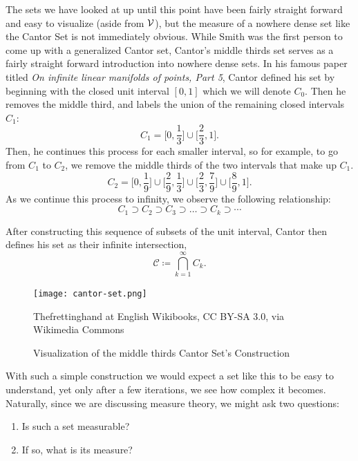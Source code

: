 \documentclass{article}
\theoremstyle{axiom} \newtheorem{axiom}{Axiom}
\theoremstyle{definition} \newtheorem{definition}{Definition}
\theoremstyle{example} \newtheorem{example}{Example}
\theoremstyle{proposition} \newtheorem{prop}{Proposition}
\theoremstyle{lemma} \newtheorem{lemma}{Lemma}
\newcommand{\sC}{\mathcal{C}}  \newcommand{\sD}{\mathcal{D}}
\begin{document}
The sets we have looked at up until this point have been fairly straight forward 
and easy to visualize (aside from $\mathcal{V}$), but the measure of a nowhere dense set like the  
Cantor Set is not immediately obvious. While Smith was the first person to come 
up with a generalized Cantor set, Cantor's middle thirds set serves as a fairly straight 
forward introduction into  nowhere dense sets. In his famous paper titled 
\textit{On infinite linear manifolds of points, Part 5}, Cantor defined his set 
by beginning with the closed unit interval $[0,1]$ which we will denote $C_0$. 
Then he removes the middle third, and labels the union of the remaining
closed intervals $C_1$: 
\begin{equation*}
	C_1 = \bigg[0,\frac{1}{3}\bigg] \cup \bigg[\frac{2}{3},1\bigg].
\end{equation*}
Then, he continues this process for each smaller interval, so for example, 
to go from $C_1$ to $C_2$, we remove the middle thirds of the two intervals that
make up $C_1$. 
\begin{equation*}
	C_2 = \bigg[0,\frac{1}{9} \bigg] \cup \bigg[\frac{2}{9},\frac{1}{3}\bigg] 
	\cup \bigg[\frac{2}{3},\frac{7}{9}\bigg] \cup \bigg[\frac{8}{9},1\bigg].
\end{equation*}
As we continue this process to infinity, we observe the following relationship:
\begin{equation*}
	C_1 \supset C_2 \supset C_3 \supset \ldots \supset C_k \supset \cdots
\end{equation*}

After constructing this sequence of subsets of the unit interval, Cantor then 
defines his set as their infinite intersection, 
\begin{equation}
	\sC \coloneqq \bigcap_{k=1}^{\infty} C_k.
\end{equation}
\begin{figure}[H]
	\begin{center}
		\texttt{[image: cantor-set.png]}
		\caption{Visualization of the middle thirds Cantor Set's Construction}
		\tiny{Thefrettinghand at English Wikibooks, CC BY-SA 3.0, via Wikimedia Commons}
	\end{center}

\end{figure}
With such a simple construction we would expect a set like this to be
easy to understand, yet only after a few iterations, we see how complex it
becomes. Naturally, since we are discussing measure theory, we might ask two 
questions:
\begin{enumerate}
	\item Is such a set measurable?
	\item If so, what is its measure? 
\end{enumerate}
\end{document}
